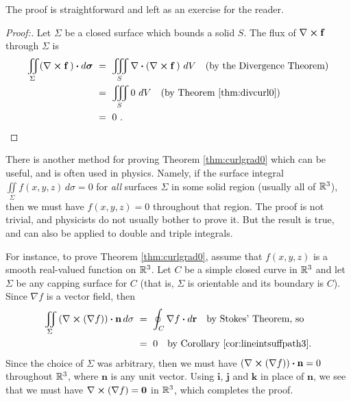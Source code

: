 The proof is straightforward and left as an exercise for the reader.

\begin{proofbar}\begin{proof}[Proof:]
 Let $\Sigma$ be a closed surface which bounds a solid $S$. The flux of $\nabla \bm{\times} \mathbf{f}$
 through $\Sigma$ is
 \begin{align*}
  \iint\limits_{\Sigma} \Dotprod{(\Crossprod{\nabla}{\mathbf{f}}\,)}{d\bm{\sigma}} ~&=~
   \iiint\limits_{S} \Dotprod{\nabla}{(\Crossprod{\nabla}{\mathbf{f}}\,)} ~dV\quad\text{(by the Divergence Theorem)}\\
   &=~ \iiint\limits_{S} 0 ~dV \quad\text{(by Theorem \ref{thm:divcurl0})}\\
   &=~ 0 ~.\hfill\qedhere
 \end{align*}
\end{proof}\end{proofbar}

There is another method for proving Theorem \ref{thm:curlgrad0} which can be useful, and is often used in physics.
Namely, if the surface integral $\iint\limits_{\Sigma} f(x,y,z)\,d\sigma = 0$
for \emph{all} surfaces $\Sigma$ in some solid region (usually all of $\mathbb{R}^{3}$), then we must have $f(x,y,z) = 0$
throughout that region. The proof is not trivial, and physicists do not usually bother to prove it. But the result is
true, and can also be applied to double and triple integrals.

For instance, to prove Theorem \ref{thm:curlgrad0}, assume that $f(x,y,z)$ is a smooth real-valued function on
$\mathbb{R}^{3}$. 
Let $C$ be a simple closed curve in $\mathbb{R}^{3}$ and let $\Sigma$ be any capping surface for $C$ 
(that is, $\Sigma$ is orientable and its boundary is $C$). Since $\nabla f$ is a vector field, then
\begin{align*}
 \iint\limits_{\Sigma} \left( \nabla \bm{\times} (\nabla f) \right)  \bm{\cdot} \mathbf{n}\,d\sigma ~&=~
  \oint_{C}\nabla f \bm{\cdot} d\mathbf{r} \quad\text{by Stokes' Theorem, so}\\
 &=~ 0 \quad\text{by Corollary \ref{cor:lineintsuffpath3}.}
\end{align*}
Since the choice of $\Sigma$ was arbitrary, then we must have $(\nabla \bm{\times} (\nabla f)) \bm{\cdot} \mathbf{n}
= 0$ throughout $\mathbb{R}^{3}$, where $\mathbf{n}$ is any unit vector. 
Using $\mathbf{i}$, $\mathbf{j}$ and $\mathbf{k}$ in place of $\mathbf{n}$, we see that we must have $\nabla \bm{\times} (\nabla f) = \mathbf{0}$ in $\mathbb{R}^{3}$, which completes the
proof.

